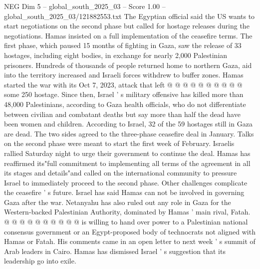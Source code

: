 \begin{textsample}{NEG Dim 5 – global\_south\_2025\_03 – Score 1.00 – global\_south\_2025\_03/121882553.txt}
The Egyptian official said the US wants to start negotiations on the second phase but called for hostage releases during the negotiations.
Hamas insisted on a full implementation of the ceasefire terms.
The first phase, which paused 15 months of fighting in Gaza, saw the release of 33 hostages, including eight bodies, in exchange for nearly 2,000 Palestinian prisoners.
Hundreds of thousands of people returned home to northern Gaza, aid into the territory increased and Israeli forces withdrew to buffer zones.
Hamas started the war with its Oct 7, 2023, attack that left @ @ @ @ @ @ @ @ @ @ some 250 hostage.
Since then, Israel ' s military offensive has killed more than 48,000 Palestinians, according to Gaza health officials, who do not differentiate between civilian and combatant deaths but say more than half the dead have been women and children.
According to Israel, 32 of the 59 hostages still in Gaza are dead.
The two sides agreed to the three-phase ceasefire deal in January.
Talks on the second phase were meant to start the first week of February.
Israelis rallied Saturday night to urge their government to continue the deal.
Hamas has reaffirmed its"full commitment to implementing all terms of the agreement in all its stages and details"and called on the international community to pressure Israel to immediately proceed to the second phase.
Other challenges complicate the ceasefire ' s future.
Israel has said Hamas can not be involved in governing Gaza after the war.
Netanyahu has also ruled out any role in Gaza for the Western-backed Palestinian Authority, dominated by Hamas ' main rival, Fatah. @ @ @ @ @ @ @ @ @ @ is willing to hand over power to a Palestinian national consensus government or an Egypt-proposed body of technocrats not aligned with Hamas or Fatah.
His comments came in an open letter to next week ' s summit of Arab leaders in Cairo.
Hamas has dismissed Israel ' s suggestion that its leadership go into exile.

\end{textsample}
